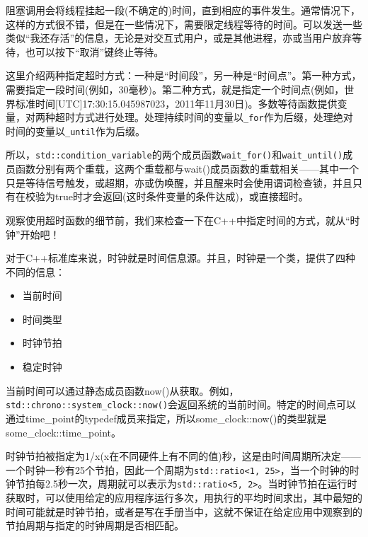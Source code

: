 
阻塞调用会将线程挂起一段(不确定的)时间，直到相应的事件发生。通常情况下，这样的方式很不错，但是在一些情况下，需要限定线程等待的时间。可以发送一些类似“我还存活”的信息，无论是对交互式用户，或是其他进程，亦或当用户放弃等待，也可以按下“取消”键终止等待。

这里介绍两种指定超时方式：一种是“时间段”，另一种是“时间点”。第一种方式，需要指定一段时间(例如，30毫秒)。第二种方式，就是指定一个时间点(例如，世界标准时间[UTC]17:30:15.045987023，2011年11月30日)。多数等待函数提供变量，对两种超时方式进行处理。处理持续时间的变量以\texttt{\_for}作为后缀，处理绝对时间的变量以\texttt{\_until}作为后缀。

所以，\texttt{std::condition\_variable}的两个成员函数\texttt{wait\_for()}和\texttt{wait\_until()}成员函数分别有两个重载，这两个重载都与wait()成员函数的重载相关——其中一个只是等待信号触发，或超期，亦或伪唤醒，并且醒来时会使用谓词检查锁，并且只有在校验为true时才会返回(这时条件变量的条件达成)，或直接超时。

观察使用超时函数的细节前，我们来检查一下在C++中指定时间的方式，就从“时钟”开始吧！


对于C++标准库来说，时钟就是时间信息源。并且，时钟是一个类，提供了四种不同的信息：

\begin{itemize}
    \item 当前时间
    \item 时间类型
    \item 时钟节拍
    \item 稳定时钟
\end{itemize}





当前时间可以通过静态成员函数now()从获取。例如，\texttt{std::chrono::system\_clock::now()}会返回系统的当前时间。特定的时间点可以通过time\_point的typedef成员来指定，所以some\_clock::now()的类型就是some\_clock::time\_point。

时钟节拍被指定为1/x(x在不同硬件上有不同的值)秒，这是由时间周期所决定——一个时钟一秒有25个节拍，因此一个周期为\texttt{std::ratio<1, 25>}，当一个时钟的时钟节拍每2.5秒一次，周期就可以表示为\texttt{std::ratio<5, 2>}。当时钟节拍在运行时获取时，可以使用给定的应用程序运行多次，用执行的平均时间求出，其中最短的时间可能就是时钟节拍，或者是写在手册当中，这就不保证在给定应用中观察到的节拍周期与指定的时钟周期是否相匹配。

